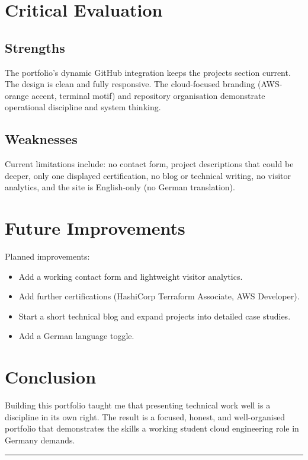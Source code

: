 \documentclass[11pt,a4paper]{article}
\begin{document}
\section{Critical Evaluation}

\subsection{Strengths}
The portfolio's dynamic GitHub integration keeps the projects section current. The design is clean and fully responsive. The cloud-focused branding (AWS-orange accent, terminal motif) and repository organisation demonstrate operational discipline and system thinking.

\subsection{Weaknesses}
Current limitations include: no contact form, project descriptions that could be deeper, only one displayed certification, no blog or technical writing, no visitor analytics, and the site is English-only (no German translation).

\section{Future Improvements}
Planned improvements:
\begin{itemize}[leftmargin=*]
  \item Add a working contact form and lightweight visitor analytics.
  \item Add further certifications (HashiCorp Terraform Associate, AWS Developer).
  \item Start a short technical blog and expand projects into detailed case studies.
  \item Add a German language toggle.
\end{itemize}

\section{Conclusion}
Building this portfolio taught me that presenting technical work well is a discipline in its own right. The result is a focused, honest, and well-organised portfolio that demonstrates the skills a working student cloud engineering role in Germany demands.

\bigskip
\hrule
\bigskip
\end{document}
